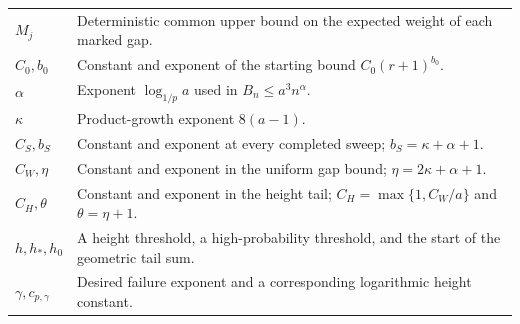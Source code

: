 \documentclass[11pt,a4paper]{article}
\theoremstyle{readable}
\begin{document}
\begin{longtable}{@{}p{.22\linewidth}p{.72\linewidth}@{}}
$M_j$ & Deterministic common upper bound on the expected weight of each marked gap. \\
$C_0,b_0$ & Constant and exponent of the starting bound $C_0(r+1)^{b_0}$. \\
$\alpha$ & Exponent $\log_{1/p}a$ used in $B_n\le a^3n^\alpha$. \\
$\kappa$ & Product-growth exponent $8(a-1)$. \\
$C_S,b_S$ & Constant and exponent at every completed sweep; $b_S=\kappa+\alpha+1$. \\
$C_W,\eta$ & Constant and exponent in the uniform gap bound; $\eta=2\kappa+\alpha+1$. \\
$C_H,\theta$ & Constant and exponent in the height tail; $C_H=\max\{1,C_W/a\}$ and $\theta=\eta+1$. \\
$h,h_*,h_0$ & A height threshold, a high-probability threshold, and the start of the geometric tail sum. \\
$\gamma,c_{p,\gamma}$ & Desired failure exponent and a corresponding logarithmic height constant. \\
\end{longtable}
\normalsize
\end{document}
